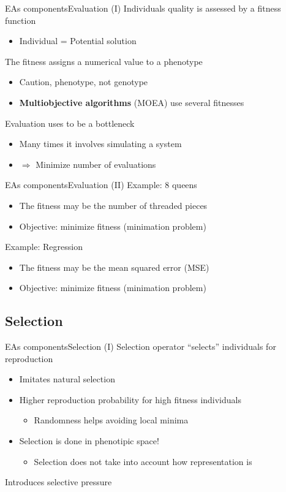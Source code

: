 \documentclass[10pt,compress]{beamer} %
\begin{document}
\begin{frame}{EAs components}{Evaluation (I)} 
	Individuals quality is assessed by a \alert{fitness function}
	\begin{itemize}
		\item Individual = Potential solution
	\end{itemize}
	The fitness assigns a numerical value to a phenotype
	\begin{itemize}
		\item Caution, phenotype, not genotype
		\item \textbf{Multiobjective algorithms} (MOEA) use several fitnesses
	\end{itemize}
	Evaluation uses to be a bottleneck
	\begin{itemize}
		\item Many times it involves simulating a system
		\item $\Rightarrow$ Minimize number of evaluations
	\end{itemize}
\end{frame}

\begin{frame}{EAs components}{Evaluation (II)} 
	Example: 8 queens
	\begin{itemize}
		\item The fitness may be the number of threaded pieces
		\item Objective: minimize fitness (minimation problem)
	\end{itemize}
	Example: Regression
	\begin{itemize}
		\item The fitness may be the mean squared error (MSE)
		\item Objective: minimize fitness (minimation problem)
	\end{itemize}
\end{frame}

\subsection{Selection}

\begin{frame}{EAs components}{Selection (I)} 
	Selection operator ``selects'' individuals for reproduction
	\begin{itemize}
		\item Imitates natural selection
		\item Higher reproduction probability for high fitness individuals
		\begin{itemize}
			\item Randomness helps avoiding local minima
		\end{itemize}
		\item Selection is done in phenotipic space!
		\begin{itemize}
			\item Selection does not take into account how representation is
		\end{itemize}
	\end{itemize}
	Introduces \alert{selective pressure}
\end{frame}
\end{document}

